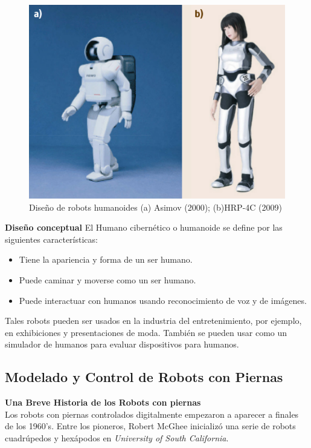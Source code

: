 \documentclass{book}
\begin{document}
\begin{figure}
	\centering		
	\includegraphics[scale=0.5]{images/asimov_and_HRP-4C.png}
	\caption{Diseño de robots humanoides (a) Asimov (2000); (b)HRP-4C (2009)}		
\end{figure}


		\textbf{Diseño conceptual}
El Humano cibernético o humanoide se define por las siguientes características:
\begin{itemize}
\item Tiene la apariencia y forma de un ser humano.
\item Puede caminar y moverse como un ser humano.
\item Puede interactuar con humanos usando reconocimiento de voz y de imágenes.
\end{itemize}
Tales robots pueden ser usados en la industria del entretenimiento, por ejemplo, en exhibiciones y presentaciones de moda. También se pueden usar como un simulador de humanos para evaluar dispositivos para humanos.\\

\subsection{Modelado y Control de Robots con Piernas}
	\textbf{Una Breve Historia de los Robots con piernas}\\
		Los robots con piernas controlados digitalmente empezaron a aparecer a finales de los 1960's. Entre los pioneros, Robert McGhee inicializó una serie de robots cuadrúpedos y hexápodos en \textit{University of South California}.\\
\end{document}
